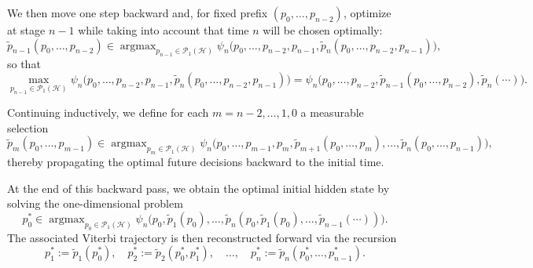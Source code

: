 \documentclass[12pt, reco]{article}
\begin{document}
We then move one step backward and, for fixed prefix
\((p_0,\dots,p_{n-2})\), optimize at stage \(n-1\) while taking into account
that time \(n\) will be chosen optimally:
\[
\widetilde{p}_{n-1}(p_0,\dots,p_{n-2})
\in \operatorname{argmax}_{p_{n-1}\in\mathcal{P}_1(\mathcal{H})}
\psi_n\bigl(p_0,\dots,p_{n-2},p_{n-1},
           \widetilde{p}_n(p_0,\dots,p_{n-2},p_{n-1})\bigr),
\]
so that
\[
\max_{p_{n-1}\in\mathcal{P}_1(\mathcal{H})}
\psi_n\bigl(p_0,\dots,p_{n-2},p_{n-1},
           \widetilde{p}_n(p_0,\dots,p_{n-2},p_{n-1})\bigr)
=
\psi_n\bigl(p_0,\dots,p_{n-2},
           \widetilde{p}_{n-1}(p_0,\dots,p_{n-2}),
           \widetilde{p}_n(\cdots)\bigr).
\]

Continuing inductively, we define for each \(m=n-2,\dots,1,0\) a measurable
selection
\[
\widetilde{p}_m(p_0,\dots,p_{m-1})
\in \operatorname{argmax}_{p_m\in\mathcal{P}_1(\mathcal{H})}
\psi_n\bigl(
p_0,\dots,p_{m-1},p_m,
\widetilde{p}_{m+1}(p_0,\dots,p_m),
\dots,
\widetilde{p}_n(p_0,\dots,p_{n-1})
\bigr),
\]
thereby propagating the optimal future decisions backward to the initial time.

At the end of this backward pass, we obtain the optimal initial hidden state
by solving the one-dimensional problem
\[
p_0^* \in \operatorname{argmax}_{p_0\in\mathcal{P}_1(\mathcal{H})}
\psi_n\bigl(
p_0,
\widetilde{p}_1(p_0),
\dots,
\widetilde{p}_n(p_0,\widetilde{p}_1(p_0),\dots,\widetilde{p}_{n-1}(\cdots))
\bigr).
\]
The associated Viterbi trajectory is then reconstructed forward via the
recursion
\[
p_1^* := \widetilde{p}_1(p_0^*),\quad
p_2^* := \widetilde{p}_2(p_0^*,p_1^*),\quad
\dots,\quad
p_n^* := \widetilde{p}_n(p_0^*,\dots,p_{n-1}^*).
\]
\end{document}
